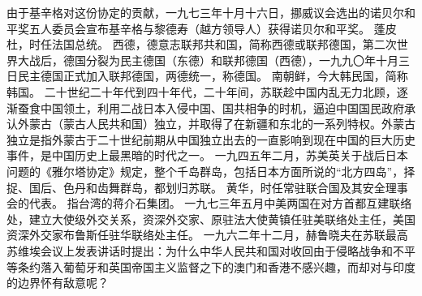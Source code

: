 \begin{maonote}
由于基辛格对这份协定的贡献，一九七三年十月十六日，挪威议会选出的诺贝尔和平奖五人委员会宣布基辛格与黎德寿（越方领导人）获得诺贝尔和平奖。
蓬皮杜，时任法国总统。
西德，德意志联邦共和国，简称西德或联邦德国，第二次世界大战后，德国分裂为民主德国（东德）和联邦德国（西德），一九九〇年十月三日民主德国正式加入联邦德国，两德统一，称德国。
南朝鲜，今大韩民国，简称韩国。
二十世纪二十年代到四十年代，二十年间，苏联趁中国内乱无力北顾，逐渐蚕食中国领土，利用二战日本入侵中国、国共相争的时机，逼迫中国国民政府承认外蒙古（蒙古人民共和国）独立，并取得了在新疆和东北的一系列特权。外蒙古独立是指外蒙古于二十世纪前期从中国独立出去的一直影响到现在中国的巨大历史事件，是中国历史上最黑暗的时代之一。
一九四五年二月，苏美英关于战后日本问题的《雅尔塔协定》规定，整个千岛群岛，包括日本方面所说的“北方四岛”，择捉、国后、色丹和齿舞群岛，都划归苏联。
黄华，时任常驻联合国及其安全理事会的代表。
指台湾的蒋介石集团。
一九七三年五月中美两国在对方首都互建联络处，建立大使级外交关系，资深外交家、原驻法大使黄镇任驻美联络处主任，美国资深外交家布鲁斯任驻华联络处主任。
一九六二年十二月，赫鲁晓夫在苏联最高苏维埃会议上发表讲话时提出：为什么中华人民共和国对收回由于侵略战争和不平等条约落入葡萄牙和英国帝国主义监督之下的澳门和香港不感兴趣，而却对与印度的边界怀有敌意呢？
\end{maonote}
